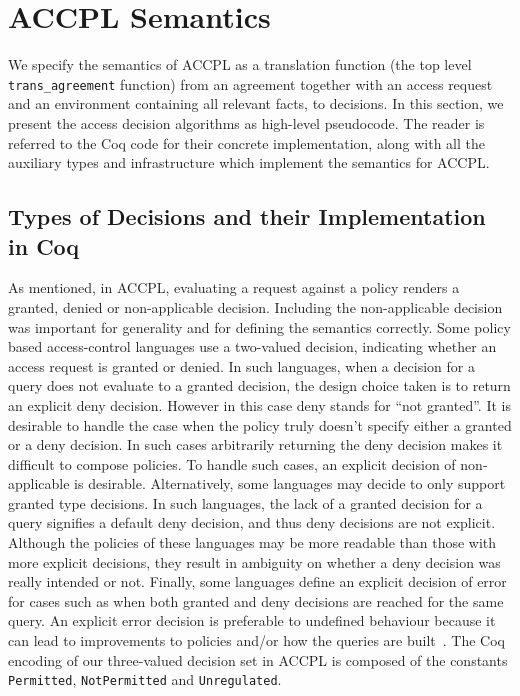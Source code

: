 \documentclass[conference]{IEEEtran}
\newcommand{\syn}{\texttt}
\begin{document}
\section{ACCPL Semantics}
We specify the semantics of \ac{ACCPL} as a translation function (the top level \syn{trans_agreement} function) from
an agreement together with an access request and an environment
containing all relevant facts, to decisions. In this section, we
present the access decision algorithms as high-level pseudocode. The reader is
referred to the Coq code for their concrete implementation, along with all the
auxiliary types and infrastructure which implement the semantics for
\ac{ACCPL}.


\subsection{Types of Decisions and their Implementation in Coq}\label{sec:answerandresulttypes}

As mentioned, in ACCPL, evaluating a request against a policy renders
a granted, denied or non-applicable decision. Including the non-applicable decision was
important for generality and for defining the semantics correctly.
Some policy based access-control languages use a two-valued decision,
indicating whether an access request is granted or denied. In
such languages, when a decision for a query does not evaluate to a granted decision, the design choice taken is to return an explicit deny
decision. However in this case deny stands for ``not granted''.
It is desirable to handle the case when the policy truly doesn't
specify either a granted or a deny decision. In such cases
arbitrarily returning the deny decision makes it difficult to
compose policies. To handle such cases, an explicit decision of non-applicable is desirable. Alternatively, some languages may decide
to only support granted type decisions. In such languages, the lack of a
granted decision for a query signifies a default deny decision,
and thus deny decisions are not explicit. Although the policies of
these languages may be more readable than those with more explicit
decisions, they result in ambiguity on whether a deny decision was
really intended or not. Finally, some languages define an explicit
decision of error for cases such as when both granted and
deny decisions are reached for the same query. An explicit
error decision is preferable to undefined behaviour because it can
lead to improvements to policies and/or how the queries are
built~\cite{Tschantz}. The Coq encoding of our three-valued decision
set in \ac{ACCPL} is composed of the constants \syn{Permitted},
\syn{NotPermitted} and \syn{Unregulated}.
\end{document}
